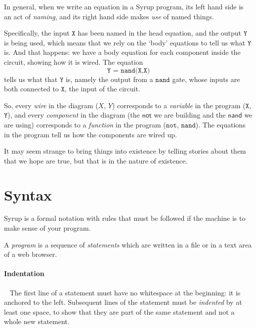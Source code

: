 \documentclass{article}
\begin{document}
In general, when we write an equation in a Syrup program, its left hand
side is an act of \emph{naming}, and its right hand side makes \emph{use} of
named things.

Specifically, the input $\texttt{X}$ has been named in the head equation,
and the output $\texttt{Y}$ is being used, which means that we rely on the
`body' equations to tell us what $\texttt{Y}$ is. And that happens: we have a
body equation for each component inside the circuit, showing how it is wired.
The equation
\[
  \texttt{Y = nand(X,X)}
\]
tells us what that $\texttt{Y}$ is, namely the output from a $\texttt{nand}$
gate, whose inputs are both connected to $\texttt{X}$, the input of the
circuit.

So, every \emph{wire} in the diagram ($X$, $Y$) corresponds to a \emph{variable}
in the program ($\texttt{X}$, $\texttt{Y}$), and every \emph{component} in the
diagram (the $\mathsf{not}$ we are building and the $\mathsf{nand}$ we are
using) corresponds to a \emph{function} in the program ($\texttt{not}$, $\texttt{nand}$).
The equations in the program tell us how the components are wired up.

It may seem strange to bring things into existence by telling stories about them
that we hope are true, but that is in the nature of existence.


\section{Syntax}

\newcommand{\Bit}{\texttt{<Bit>}}
\newcommand{\cab}[1]{\texttt{[}#1\texttt{]}}
\newcommand{\pa}[1]{\texttt{(}#1\texttt{)}}
\newcommand{\NT}[1]{\langle\mathit{#1}\rangle}

Syrup is a formal notation with rules that must be followed if the machine is to make sense of your program.

A \emph{program} is a sequence of \emph{statements} which are written in a file or in a text area of a web browser.

\paragraph{Indentation}~ The first line of a statement must have no whitespace at the beginning: it is anchored to the left. Subsequent lines of the statement must be \emph{indented} by at least one space, to show that they are part of the same statement and not a whole new statement.
\end{document}
